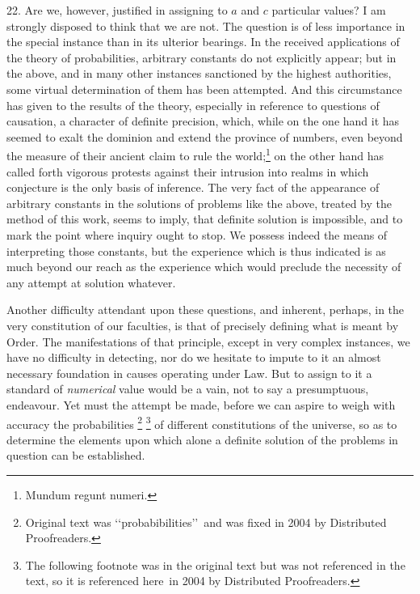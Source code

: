 \documentclass[oneside]{book}
\begin{document}
22. Are we, however, justified in assigning to $a$ and $c$ particular values?
I am strongly disposed to think that we are not.
The question is of less importance in the special instance than
in its ulterior bearings. In the received applications of the theory
of probabilities, arbitrary constants do not explicitly appear;
but in the above, and in many other instances sanctioned by the
highest authorities, some virtual determination of them has been
attempted. And this circumstance has given to the results of
the theory, especially in reference to questions of causation, a
character of definite precision, which, while on the one hand it
has seemed to exalt the dominion and extend the province of
numbers, even beyond the measure of their ancient claim to rule
the world;\footnote{Mundum regunt numeri.} on the other hand has called forth vigorous protests
against their intrusion into realms in which conjecture is the only
basis of inference. The very fact of the appearance of arbitrary
constants in the solutions of problems like the above, treated
by the method of this work, seems to imply, that definite solution
is impossible, and to mark the point where inquiry ought to stop.
We possess indeed the means of interpreting those constants, but
the experience which is thus indicated is as much beyond our
reach as the experience which would preclude the necessity of
any attempt at solution whatever.

Another difficulty attendant upon these questions, and inherent, perhaps,
in the very constitution of our faculties, is that of
precisely defining what is meant by Order. The manifestations
of that principle, except in very complex instances, we have no
difficulty in detecting, nor do we hesitate to impute to it an almost
necessary foundation in causes operating under Law. But
to assign to it a standard of \emph{numerical} value would be a vain,
not to say a presumptuous, endeavour. Yet must the attempt be
made, before we can aspire to weigh with accuracy the
probabilities%
\footnote{Original text was \lq\lq probabibilities\rq\rq\ and
was fixed in 2004 by Distributed Proofreaders.}
\footnote{The following footnote was in the original text but was
not referenced in the text, so it is referenced here\footnotemark\ in
2004 by Distributed Proofreaders.}
of different constitutions of the universe, so as to determine the
elements upon which alone a definite solution of the
problems in question can be established.
\end{document}
